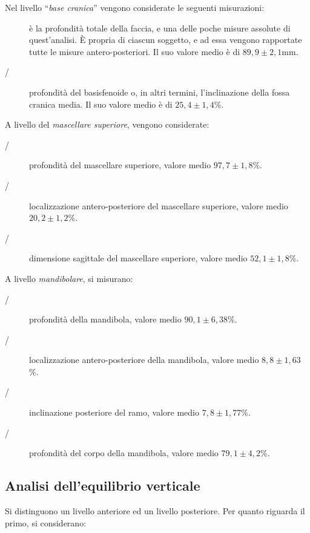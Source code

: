 Nel livello ``\textit{base cranica}'' vengono considerate le seguenti misurazioni:

\begin{description}
\item[] è la profondità totale della faccia, e una delle poche misure assolute di quest'analisi. È propria di ciascun soggetto, e ad essa vengono rapportate tutte le misure antero-posteriori. Il suo valore medio è di $89,9 \pm 2,1$mm.
\item[/] profondità del basisfenoide o, in altri termini, l'inclinazione della fossa cranica media. Il suo valore medio è di $25,4 \pm 1,4$\%.
\end{description}

A livello del \textit{mascellare superiore}, vengono considerate:

\begin{description}
\item[/] profondità del mascellare superiore, valore medio $97,7 \pm 1,8$\%.
\item[/] localizzazione antero-posteriore del mascellare superiore, valore medio $20,2 \pm 1,2$\%.
\item[/] dimensione sagittale del mascellare superiore, valore medio $52,1 \pm 1,8$\%.
\end{description}

A livello \textit{mandibolare}, si misurano:

\begin{description}
\item[/] profondità della mandibola, valore medio $90,1 \pm 6,38$\%.
\item[/] localizzazione antero-posteriore della mandibola, valore medio $8,8 \pm 1,63$\%.
\item[/] inclinazione posteriore del ramo, valore medio $7,8 \pm 1,77$\%.
\item[/] profondità del corpo della mandibola, valore medio $79,1 \pm 4,2$\%.
\end{description}

\subsection{Analisi dell'equilibrio verticale}
Si distinguono un livello anteriore ed un livello posteriore. Per quanto riguarda il primo, si considerano:


